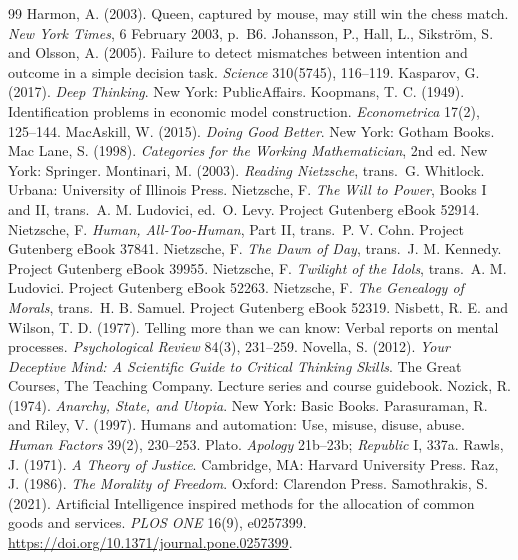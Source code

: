 \documentclass[11pt]{article}
\theoremstyle{definition}
\theoremstyle{remark}
\begin{document}
\begin{thebibliography}{99}
 Harmon, A. (2003). Queen, captured by mouse, may still win the chess match. \emph{New York Times}, 6 February 2003, p.\ B6.
 Johansson, P., Hall, L., Sikstr\"om, S. and Olsson, A. (2005). Failure to detect mismatches between intention and outcome in a simple decision task. \emph{Science} 310(5745), 116--119.
 Kasparov, G. (2017). \emph{Deep Thinking}. New York: PublicAffairs.
 Koopmans, T. C. (1949). Identification problems in economic model construction. \emph{Econometrica} 17(2), 125--144.
 MacAskill, W. (2015). \emph{Doing Good Better}. New York: Gotham Books.
 Mac Lane, S. (1998). \emph{Categories for the Working Mathematician}, 2nd ed. New York: Springer.
 Montinari, M. (2003). \emph{Reading Nietzsche}, trans.\ G. Whitlock. Urbana: University of Illinois Press.
 Nietzsche, F. \emph{The Will to Power}, Books I and II, trans.\ A. M. Ludovici, ed.\ O. Levy. Project Gutenberg eBook 52914.
 Nietzsche, F. \emph{Human, All-Too-Human}, Part II, trans.\ P. V. Cohn. Project Gutenberg eBook 37841.
 Nietzsche, F. \emph{The Dawn of Day}, trans.\ J. M. Kennedy. Project Gutenberg eBook 39955.
 Nietzsche, F. \emph{Twilight of the Idols}, trans.\ A. M. Ludovici. Project Gutenberg eBook 52263.
 Nietzsche, F. \emph{The Genealogy of Morals}, trans.\ H. B. Samuel. Project Gutenberg eBook 52319.
 Nisbett, R. E. and Wilson, T. D. (1977). Telling more than we can know: Verbal reports on mental processes. \emph{Psychological Review} 84(3), 231--259.
 Novella, S. (2012). \emph{Your Deceptive Mind: A Scientific Guide to Critical Thinking Skills}. The Great Courses, The Teaching Company. Lecture series and course guidebook.
 Nozick, R. (1974). \emph{Anarchy, State, and Utopia}. New York: Basic Books.
 Parasuraman, R. and Riley, V. (1997). Humans and automation: Use, misuse, disuse, abuse. \emph{Human Factors} 39(2), 230--253.
 Plato. \emph{Apology} 21b--23b; \emph{Republic} I, 337a.
 Rawls, J. (1971). \emph{A Theory of Justice}. Cambridge, MA: Harvard University Press.
 Raz, J. (1986). \emph{The Morality of Freedom}. Oxford: Clarendon Press.
 Samothrakis, S. (2021). Artificial Intelligence inspired methods for the allocation of common goods and services. \emph{PLOS ONE} 16(9), e0257399. \url{https://doi.org/10.1371/journal.pone.0257399}.

\end{thebibliography}
\end{document}
